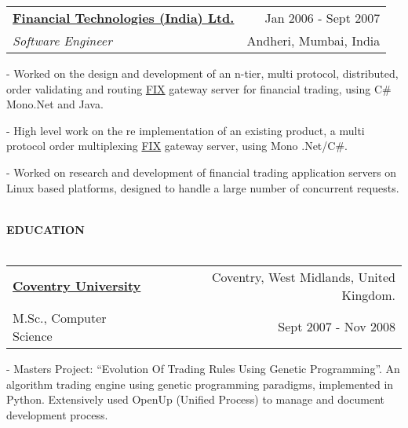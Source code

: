 \documentclass[12pt]{article}
\makeatletter
\newcommand{\lineunder}{\vspace*{-10pt} \\ \hspace*{-18pt} \hrulefill \vspace{2pt}\\}
\newcommand{\header}[1]{{\hspace*{-15pt}\vspace*{-0pt}\\ \uppercase{\textbf {#1}}}  \lineunder}
\newcommand{\employer}[4]{ 
        \vspace*{6pt}
	\begin{tabular*}{\textwidth}{l@{\extracolsep{\fill}}r}
	\textbf{#1} & #2 \\
                #3  & #4 \\ 
	\end{tabular*}
}
\newenvironment{achievements}{
        \vspace{-0pt}
        \begin{list}
        {}
        {\topsep 0pt \itemsep -3pt}
}
{
        \end{list}
}
\makeatother
\begin{document}
\vspace{5pt}
\employer{\href{http://www.ftindia.com/}{Financial Technologies (India) Ltd.}}{Jan 2006 - Sept 2007}{\emph{Software Engineer}} {Andheri, Mumbai, India}
	\begin{achievements}
        \item[-] Worked on the design and development of an n-tier, multi protocol, distributed, order validating and routing \href{http://en.wikipedia.org/wiki/FIX_protocol}{FIX} gateway server for financial trading, using C\# Mono.Net and Java.
        \item[-] High level work on the re implementation of an existing product, a multi protocol order multiplexing \href{http://en.wikipedia.org/wiki/FIX_protocol}{FIX} gateway server, using Mono .Net/C\#.
        \item[-] Worked on research and development of financial trading application servers on Linux based platforms, designed to handle a large number of concurrent requests.
	\end{achievements}
\vspace{5pt}
\header{Education}
\employer{\href{http://www.coventry.ac.uk}{Coventry University}}{Coventry, West Midlands, United Kingdom.}
{M.Sc., Computer Science} { Sept 2007 - Nov 2008}
    \begin{achievements}
        \item[-] Masters Project: ``Evolution Of Trading Rules Using Genetic Programming''.
        An algorithm trading engine using genetic programming paradigms, implemented in Python.
        Extensively used OpenUp (Unified Process) to manage and document development process.
	\end{achievements}
%
\end{document}
